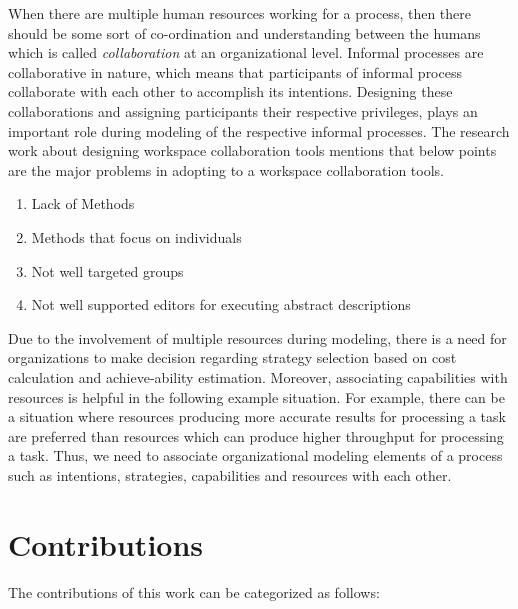 When there are multiple human resources working for a process, then there should be some sort of co-ordination and understanding between the humans which is called \textit{collaboration} at an organizational level. Informal processes are collaborative in nature, which means that participants of informal process collaborate with each other to accomplish its intentions\cite{Sungur2015}. Designing these collaborations and assigning participants their respective privileges, plays an important role during modeling of the respective informal processes. The research work about designing workspace collaboration tools \cite{Matthews2011} mentions that below points are the major problems in adopting to a workspace collaboration tools.

\begin{enumerate}
	\item Lack of Methods
	\item Methods that focus on individuals
	\item Not well targeted groups
	\item Not well supported editors for executing abstract descriptions
\end{enumerate}

Due to the involvement of multiple resources during modeling, there is a need for organizations to make decision regarding strategy selection based on cost calculation and achieve-ability estimation.  Moreover, associating capabilities with resources is helpful in the following example situation. For example, there can be a situation where resources producing more accurate results for processing a task are preferred than resources which can produce higher throughput for processing a task. Thus, we need to associate organizational modeling elements of a process such as intentions, strategies, capabilities and resources with each other. 

\section {Contributions}
\label{sec:researchobjectives}
The contributions of this work can be categorized as follows:

